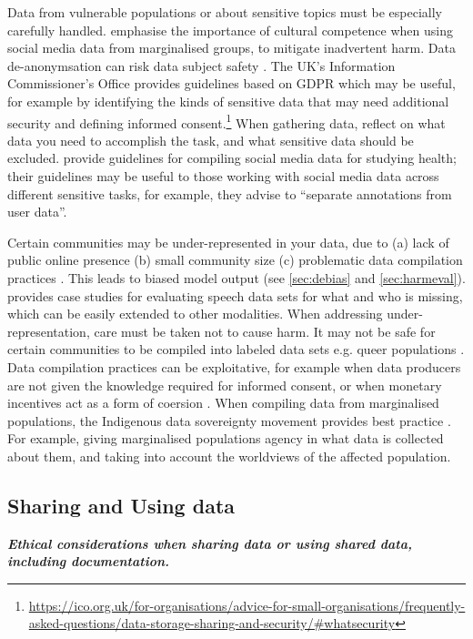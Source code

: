Data from vulnerable populations or about sensitive topics must be especially carefully handled. \citet{klassen_this_2022} emphasise the importance of cultural competence when using social media data from marginalised groups, to mitigate inadvertent harm. Data de-anonymsation can risk data subject safety \citep{rocher_estimating_2019}. The UK's Information Commissioner's Office provides guidelines based on GDPR which may be useful, for example by identifying the kinds of sensitive data that may need additional security and defining informed consent.\footnote{\url{https://ico.org.uk/for-organisations/advice-for-small-organisations/frequently-asked-questions/data-storage-sharing-and-security/\#whatsecurity}} When gathering data, reflect on what data you need to accomplish the task, and what sensitive data should be excluded. 
\citet{benton_ethical_2017} provide guidelines for compiling social media data for studying health; their guidelines may be useful to those working with social media data across different sensitive tasks, for example, they advise to ``separate annotations from user data''.

Certain communities may be under-represented in your data, due to (a) lack of public online presence (b) small community size (c) problematic data compilation practices \citep{guyan_constructing_2021}. This leads to biased model output (see \cref{sec:debias} and \cref{sec:harmeval}). \citet{markl_mind_2022} provides case studies for evaluating speech data sets for what and who is missing, which can be easily extended to other modalities. When addressing under-representation, care must be taken not to cause harm. It may not be safe for certain communities to be compiled into labeled data sets e.g. queer populations \citep{ungless_stereotypes_2023, sigurgeirsson_just_2024}. Data compilation practices can be exploitative, for example when data producers are not given the knowledge required for informed consent, or when monetary incentives act as a form of coersion \citep{fussell_how_2019, reid_ethics_2021, mahelona_openais_2023}. When compiling data from marginalised populations, the Indigenous data sovereignty movement provides best practice \citep{walter_indigenous_2021}. For example, giving marginalised populations agency in what data is collected about them, and taking into account the worldviews of the affected population.

\subsection{Sharing and Using data}\label{subsec:share}\noindent\textbf{\textit{Ethical considerations when sharing data or using shared data, including documentation.}}
\newline 

